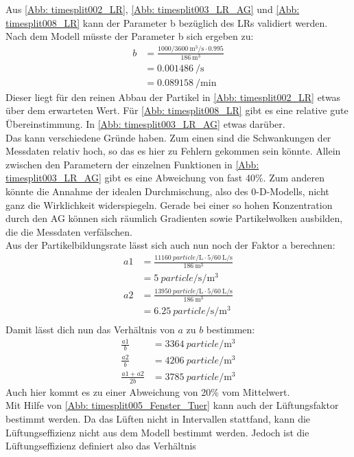 \documentclass[12pt,a4paper,bibtotocnumbered,liststotocnumbered]{scrreprt}
\begin{document}
Aus \autoref{Abb: timesplit002_LR}, \ref{Abb: timesplit003_LR_AG} und \ref{Abb: timesplit008_LR} kann der Parameter b bezüglich des \acp{LR} validiert werden. Nach dem Modell müsste der Parameter b sich ergeben zu:
\begin{align}
b &= \frac{1000/\SI{3600}{\cubic\meter\per\second}   \cdot  0.995}{\SI{186}{\cubic\meter}}\\
&= \SI{0.001486}{\per\second} \\
&= \SI{0.089158}{\per\minute}
\end{align}
Dieser liegt für den reinen Abbau der Partikel in  \autoref{Abb: timesplit002_LR} etwas über dem erwarteten Wert. Für  \autoref{Abb: timesplit008_LR} gibt es eine relative gute Übereinstimmung. In \autoref{Abb: timesplit003_LR_AG} etwas darüber. \\
Das kann verschiedene Gründe haben. Zum einen sind die Schwankungen der Messdaten relativ hoch, so das es hier zu Fehlern gekommen sein könnte. Allein zwischen den Parametern der einzelnen Funktionen in \autoref{Abb: timesplit003_LR_AG} gibt es eine Abweichung von fast 40\%. Zum anderen könnte die Annahme der idealen Durchmischung, also des 0-D-Modells, nicht ganz die Wirklichkeit widerspiegeln. Gerade bei einer so hohen Konzentration durch den \ac{AG} können sich räumlich Gradienten sowie Partikelwolken ausbilden, die die Messdaten verfälschen.\\
Aus der Partikelbildungsrate lässt sich auch nun noch der Faktor a berechnen:
\begin{align}
a1 &= \frac{\SI{11160}{particle\per\liter}   \cdot   5/\SI{60}{\liter\per\second}}{\SI{186}{\cubic\meter}}\\
&= \SI{5}{particle\per\second\per\cubic\meter} \\
a2 &= \frac{\SI{13950}{particle\per\liter}   \cdot   5/\SI{60}{\liter\per\second}}{\SI{186}{\cubic\meter}}\\
&= \SI{6.25}{particle\per\second\per\cubic\meter} \\
\end{align}
Damit lässt dich nun das Verhältnis von $a$ zu $b$ bestimmen:
\begin{align}
\frac{a1}{b} &=   \SI{3364}{particle\per\cubic\meter} \\
\frac{a2}{b} &=   \SI{4206}{particle\per\cubic\meter}  \\
\frac{a1 + a2}{2 b} &=   \SI{3785}{particle\per\cubic\meter} 
\end{align}
Auch hier kommt es zu einer Abweichung von 20\% vom Mittelwert.\\
Mit Hilfe von \autoref{Abb: timesplit005_Fenster_Tuer} kann auch der Lüftungsfaktor bestimmt werden. Da das Lüften nicht in Intervallen stattfand, kann die Lüftungseffizienz nicht aus dem Modell bestimmt werden. Jedoch ist die Lüftungseffizienz definiert also das Verhältnis 




\newpage
\RaggedRight



\listoffigures

\listoftables
\end{document}
